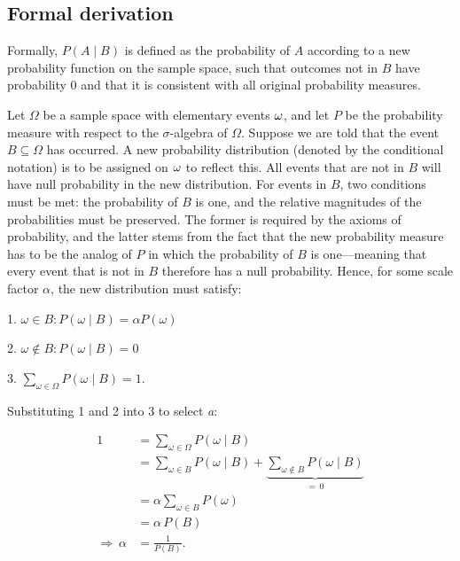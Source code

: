 \subsection{Formal derivation}
\label{sss:form-e5ae}




Formally, $P(A \mid B)$ is defined as the probability of $A$ according to a new
probability function on the sample space, such that outcomes not in $B$ have probability 0
and that it is consistent with all original probability measures.



Let $\Omega$ be a sample space with elementary events $\\{\omega\\}$, and let $P$ be the
probability measure with respect to the $\sigma$-algebra of $\Omega$. Suppose we are told
that the event $B \subseteq \Omega$ has occurred. A new probability distribution (denoted
by the conditional notation) is to be assigned on $\\{\omega\\}$ to reflect this. All
events that are not in $B$ will have null probability in the new distribution. For events
in $B$, two conditions must be met: the probability of $B$ is one, and the relative
magnitudes of the probabilities must be preserved. The former is required by the axioms of
probability, and the latter stems from the fact that the new probability measure has to be
the analog of $P$ in which the probability of $B$ is one—meaning that every event that is
not in $B$ therefore has a null probability. Hence, for some scale factor $\alpha$, the
new distribution must satisfy:



1.  $\omega \in B : P(\omega\mid B) = \alpha P(\omega)$

2.  $\omega \not \in B : P(\omega\mid B) = 0$

3.  $\sum _{\omega \in \Omega} {P(\omega\mid B)} = 1.$



Substituting 1 and 2 into 3 to select \textit{a}:


\[
\begin{aligned}
1 
&= \sum_{\omega \in \Omega} P(\omega \mid B) \\
&= \sum_{\omega \in B} P(\omega \mid B)
   + \underbrace{\sum_{\omega \notin B} P(\omega \mid B)}_{=\,0} \\
&= \alpha \sum_{\omega \in B} P(\omega) \\
&= \alpha\, P(B) \\
\Rightarrow\ \alpha &= \frac{1}{P(B)}.
\end{aligned}
\]


